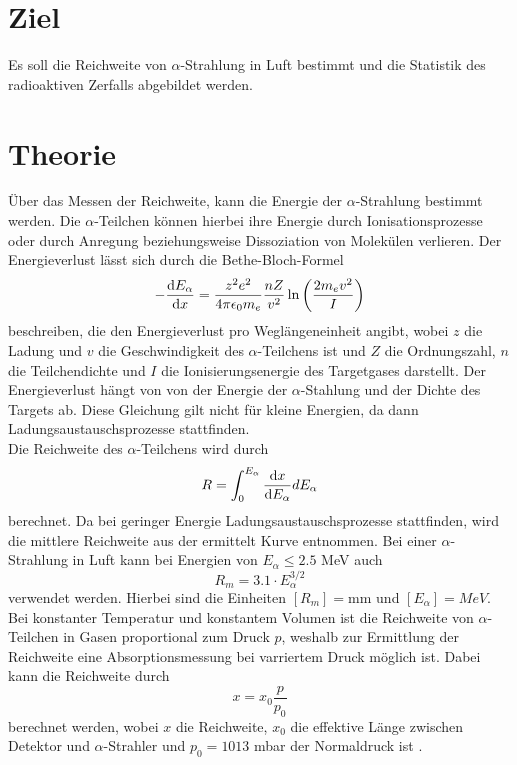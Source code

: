 \section{Ziel}
Es soll die Reichweite von $\alpha$-Strahlung in Luft bestimmt und die Statistik des radioaktiven Zerfalls abgebildet werden. 

\section{Theorie}
Über das Messen der Reichweite, kann die Energie der $\alpha$-Strahlung bestimmt werden. Die $\alpha$-Teilchen können hierbei ihre Energie durch Ionisationsprozesse oder durch Anregung beziehungsweise Dissoziation von Molekülen verlieren. Der Energieverlust lässt sich durch die Bethe-Bloch-Formel
\begin{equation}
  - \dv{E_\alpha}{x}=\frac{z^2 e^2}{4 \pi \epsilon_0 m_e}\frac{nZ}{v^2}\ln{\left(\frac{2m_e v^2}{I}\right)}
  \label{eq:1}
\end{equation}
beschreiben, die den Energieverlust pro Weglängeneinheit angibt, wobei $z$ die Ladung und $v$ die Geschwindigkeit des $\alpha$-Teilchens ist und $Z$ die Ordnungszahl, $n$ die Teilchendichte und $I$ die Ionisierungsenergie des Targetgases darstellt. Der Energieverlust hängt von von der Energie der $\alpha$-Stahlung und der Dichte des Targets ab. Diese Gleichung gilt nicht für kleine Energien, da dann Ladungsaustauschsprozesse stattfinden.\\
Die Reichweite des $\alpha$-Teilchens wird durch
\begin{equation}
  R=\int_{0}^{E_{\alpha}} \dv{x}{E_{\alpha}} dE_{\alpha}
  \label{eq:2}
\end{equation}
berechnet. Da bei geringer Energie Ladungsaustauschsprozesse stattfinden, wird die mittlere Reichweite aus der ermittelt Kurve entnommen. Bei einer $\alpha$-Strahlung in Luft kann bei Energien von $E_\alpha \leq 2.5$ MeV auch 
\begin{equation}
  R_m=3.1\cdot E_\alpha^{3/2}
  \label{eq:3}
\end{equation}
verwendet werden. Hierbei sind die Einheiten $[R_m]=\textrm{mm}$ und $[E_\alpha]=MeV$.\\
Bei konstanter Temperatur und konstantem Volumen ist die Reichweite von $\alpha$-Teilchen in Gasen proportional zum Druck $p$, weshalb zur Ermittlung der Reichweite eine Absorptionsmessung bei varriertem Druck möglich ist. Dabei kann die Reichweite durch
\begin{equation}
  x=x_0 \frac{p}{p_0}
  \label{eq:4}
\end{equation}
berechnet werden, wobei $x$ die Reichweite, $x_0$ die effektive Länge zwischen Detektor und $\alpha$-Strahler und $p_0=1013$ mbar der Normaldruck ist \cite{1}.
